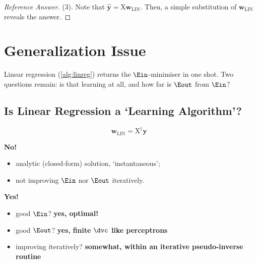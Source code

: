 \begin{proof}[Reference Answer]
    (3). Note that \(\hat{\bm{y}} = \mathrm{X} \bm{w}_{\mathrm{LIN}}\). Then, a
    simple substitution of \(\bm{w}_{\mathrm{LIN}}\) reveals the answer.
\end{proof}

\section{Generalization Issue}\label{sec:linreg-gen}


Linear regression (\autoref{alg:linreg}) returns the \(\Ein\)-minimiser in
one shot. Two questions
remain: is that learning at all, and how far is \(\Eout\) from \(\Ein\)?

\subsection{Is Linear Regression a `Learning Algorithm'?}

\[
    \bm{w}_{\mathrm{LIN}} = \mathrm{X}^\dagger \bm{y}
\]

\begin{center}
    \begin{minipage}[t]{0.42\textwidth}
        \raggedright
        \textbf{No!}
        \begin{itemize}
            \item analytic (\textcolor{orange!85!black}{closed-form}) solution,
                `instantaneous';
            \item not improving \(\Ein\) nor \(\Eout\) iteratively.
        \end{itemize}
    \end{minipage}%
    \hfill
    \begin{minipage}[t]{0.52\textwidth}
        \raggedright
        \textbf{Yes!}
        \begin{itemize}
            \item good \(\Ein\)?
                \textcolor{orange!85!black}{\textbf{yes, optimal!}}
            \item good \(\Eout\)?
                \textcolor{orange!85!black}{\textbf{yes, finite \(\dvc\) like
                perceptrons}}
            \item improving iteratively?
                \textcolor{orange!85!black}{\textbf{somewhat, within an
                iterative pseudo-inverse routine}}
        \end{itemize}
    \end{minipage}
\end{center}


